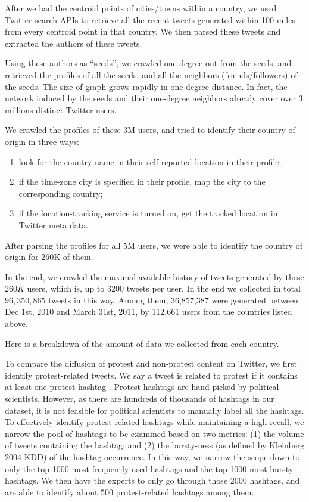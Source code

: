 \documentclass[phd,tocprelim]{cornell}
\begin{document}
After we had the centroid points of cities/towns within a country, we used Twitter search APIs to retrieve all the recent tweets generated within 100 miles from every centroid point in that country. We then parsed these tweets and extracted the authors of these tweets.

Using these authors as ``seeds'', we crawled one degree out from the seeds, and retrieved the profiles of all the seeds, and all the neighbors (friends/followers) of the seeds. The size of graph grows rapidly in one-degree distance. In fact, the network induced by the seeds and their one-degree neighbors already cover over 3 millions distinct Twitter users.

We crawled the profiles of these 3M users, and tried to identify their country of origin in three ways:
\begin{enumerate}
\item look for the country name in their self-reported location in their profile;
\item if the time-zone city is specified in their profile, map the city to the corresponding country;
\item if the location-tracking service is turned on, get the tracked location in Twitter meta data.
\end{enumerate}

After parsing the profiles for all 5M users, we were able to identify the country of origin for 260K of them.

In the end, we crawled the maximal available history of tweets generated by these $260K$ users, which is, up to $3200$ tweets per user. In the end we collected in total $96,350,865$ tweets in this way. Among them, 36,857,387 were generated between Dec 1st, 2010 and March 31st, 2011, by 112,661 users  from the countries listed above.

Here is a breakdown of the amount of data we collected from each country.

To compare the diffusion of protest and non-protest content on Twitter, we first identify protest-related tweets. We say a tweet is related to protest if it contains at least one protest hashtag .  Protest hashtags are hand-picked by political scientists. However, as there are hundreds of thousands of  hashtags in our dataset, it is not feasible for political scientists to manually label all the hashtags. To effectively identify protest-related hashtags while maintaining a high recall, we narrow the pool of hashtags to be examined based on two metrics: (1) the volume of tweets containing the hashtag; and (2) the bursty-ness (as defined by Kleinberg 2004 KDD) of the hashtag occurrence. In this way, we narrow the scope down to only the top 1000 most frequently used hashtags and the top 1000 most bursty hashtags. We then have the experts to only go through those 2000 hashtags, and are able to identify about 500 protest-related hashtags among them.
\end{document}
